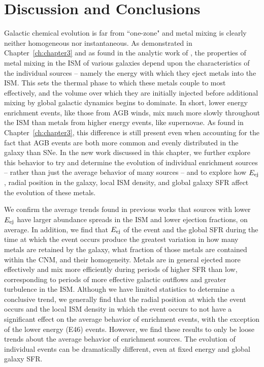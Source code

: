 \section{Discussion and Conclusions}
\label{ch4:sec:discussion conclusion}

Galactic chemical evolution is far from ``one-zone" and metal mixing is clearly neither homogeneous nor instantaneous. As demonstrated in Chapter~\ref{ch:chapter3}
and as found in the analytic work of \cite{KrumholzTing2018}, the properties of metal mixing in the ISM of various galaxies depend upon the characteristics of the individual sources -- namely the energy with which they eject metals into the ISM. This sets the thermal phase to which these metals couple to most effectively, and the volume over which they are initially injected before additional mixing by global galactic dynamics begins to dominate. In short, lower energy enrichment events, like those from AGB winds, mix much more slowly throughout the ISM than metals from higher energy events, like supernovae. As found in Chapter~\ref{ch:chapter3},
this difference is still present even when accounting for the fact that AGB events are both more common and evenly distributed in the galaxy than SNe. In the new work discussed in this chapter, we further explore this behavior to try and determine the evolution of individual enrichment sources -- rather than just the average behavior of many sources -- and to explore how $E_{\rm ej}$, radial position in the galaxy, local ISM density, and global galaxy SFR affect the evolution of these metals.

We confirm the average trends found in previous works that sources with lower $E_{\rm ej}$ have larger abundance spreads in the ISM and lower ejection fractions, on average. In addition, we find that $E_{\rm ej}$ of the event and the global SFR during the time at which the event occurs produce the greatest variation in how many metals are retained by the galaxy, what fraction of those metals are contained within the CNM, and their homogeneity. Metals are in general ejected more effectively and mix more efficiently during periods of higher SFR than low, corresponding to periods of more effective galactic outflows and greater turbulence in the ISM. Although we have limited statistics to determine a conclusive trend, we generally find that the radial position at which the event occurs and the local ISM density in which the event occurs to not have a significant effect on the average behavior of enrichment events, with the exception of the lower energy (E46) events. However, we find these results to only be loose trends about the average behavior of enrichment sources. The evolution of individual events can be dramatically different, even at fixed energy and global galaxy SFR.


